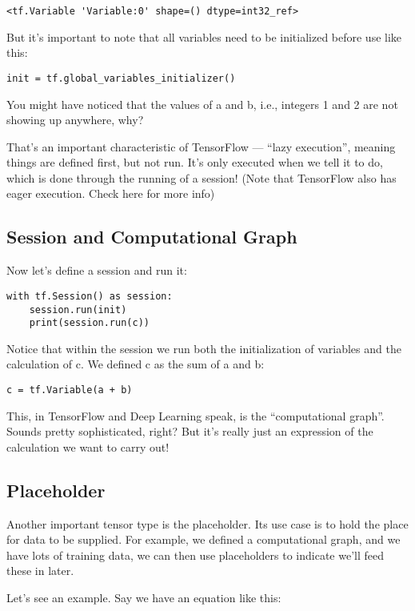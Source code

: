\begin{lstlisting}
<tf.Variable 'Variable:0' shape=() dtype=int32_ref>
\end{lstlisting}
But it's important to note that all variables need to be initialized before use like this:

\begin{lstlisting}
init = tf.global_variables_initializer()
\end{lstlisting}
You might have noticed that the values of a and b, i.e., integers 1 and 2 are not showing up anywhere, why?

That's an important characteristic of TensorFlow --- ``lazy execution'', meaning things are defined first, but not run. It's only executed when we tell it to do, which is done through the running of a session! (Note that TensorFlow also has eager execution. Check here for more info)

\subsection{Session and Computational Graph}

Now let's define a session and run it:

\begin{lstlisting}
with tf.Session() as session:                    
    session.run(init)                            
    print(session.run(c))
\end{lstlisting}
Notice that within the session we run both the initialization of variables and the calculation of c. We defined c as the sum of a and b:

\begin{lstlisting}
c = tf.Variable(a + b)
\end{lstlisting}
This, in TensorFlow and Deep Learning speak, is the ``computational graph''. Sounds pretty sophisticated, right? But it's really just an expression of the calculation we want to carry out!

\subsection{Placeholder}

Another important tensor type is the placeholder. Its use case is to hold the place for data to be supplied. For example, we defined a computational graph, and we have lots of training data, we can then use placeholders to indicate we'll feed these in later.

Let's see an example. Say we have an equation like this:

